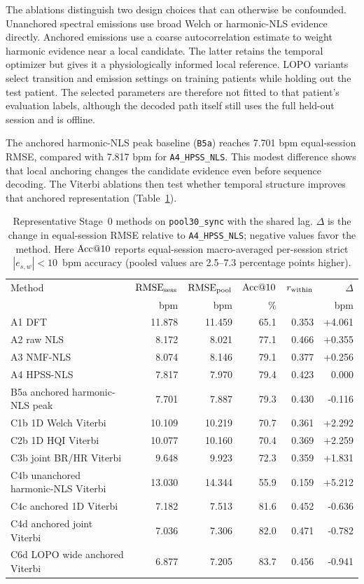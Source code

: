 The ablations distinguish two design choices that can otherwise be confounded. Unanchored spectral
emissions use broad Welch or harmonic-NLS evidence directly. Anchored emissions use a coarse
autocorrelation estimate to weight harmonic evidence near a local candidate. The latter retains
the temporal optimizer but gives it a physiologically informed local reference. LOPO variants
select transition and emission settings on training patients while holding out the test patient.
The selected parameters are therefore not fitted to that patient's evaluation labels, although
the decoded path itself still uses the full held-out session and is offline.

The anchored harmonic-NLS peak baseline (\texttt{B5a}) reaches 7.701 bpm equal-session RMSE,
compared with 7.817 bpm for \texttt{A4\_HPSS\_NLS}. This modest difference shows that local
anchoring changes the candidate evidence even before sequence decoding. The Viterbi ablations
then test whether temporal structure improves that anchored representation (Table~\ref{tab:ch3_viterbi_ladder}).

\begin{table}[htbp]
  \centering
  \small
  \caption{Representative Stage~0 methods on \texttt{pool30\_sync} with the shared lag. $\Delta$ is
  the change in equal-session RMSE relative to \texttt{A4\_HPSS\_NLS}; negative values favor the method.
  Here $\mathrm{Acc}@10$ reports equal-session macro-averaged per-session strict $|e_{s,w}|<10$~bpm
  accuracy (pooled values are 2.5--7.3 percentage points higher).}
  \label{tab:ch3_viterbi_ladder}
  \begin{tabular}{@{}lrrrrr@{}}
    \toprule
    Method & $\mathrm{RMSE}_{\mathrm{sess}}$ & $\mathrm{RMSE}_{\mathrm{pool}}$ & $\mathrm{Acc}@10$ & $r_{\mathrm{within}}$ & $\Delta$ \\
    & bpm & bpm & \% & & bpm \\
    \midrule
    A1 DFT & 11.878 & 11.459 & 65.1 & 0.353 & +4.061 \\
    A2 raw NLS & 8.172 & 8.021 & 77.1 & 0.466 & +0.355 \\
    A3 NMF-NLS & 8.074 & 8.146 & 79.1 & 0.377 & +0.256 \\
    A4 HPSS-NLS & 7.817 & 7.970 & 79.4 & 0.423 & 0.000 \\
    B5a anchored harmonic-NLS peak & 7.701 & 7.887 & 79.3 & 0.430 & -0.116 \\
    C1b 1D Welch Viterbi & 10.109 & 10.219 & 70.7 & 0.361 & +2.292 \\
    C2b 1D HQI Viterbi & 10.077 & 10.160 & 70.4 & 0.369 & +2.259 \\
    C3b joint BR/HR Viterbi & 9.648 & 9.923 & 72.3 & 0.359 & +1.831 \\
    C4b unanchored harmonic-NLS Viterbi & 13.030 & 14.344 & 55.9 & 0.159 & +5.212 \\
    C4c anchored 1D Viterbi & 7.182 & 7.513 & 81.6 & 0.452 & -0.636 \\
    C4d anchored joint Viterbi & 7.036 & 7.306 & 82.0 & 0.471 & -0.782 \\
    C6d LOPO wide anchored Viterbi & 6.877 & 7.205 & 83.7 & 0.456 & -0.941 \\
    \bottomrule
  \end{tabular}
\end{table}

